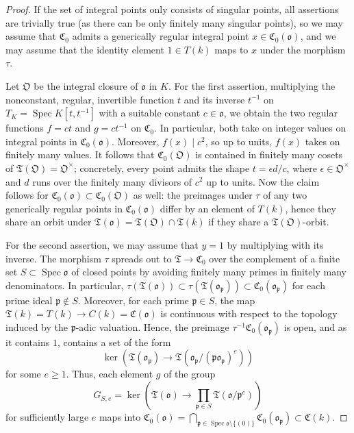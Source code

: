 \documentclass[a4paper, twoside, 11pt]{amsart}
\theoremstyle{definition}
\newcommand{\mC}{\mathfrak{C}}
\newcommand{\mT}{\mathfrak{T}}
\newcommand{\fo}{\mathfrak{o}}
\newcommand{\fO}{\mathfrak{O}}
\newcommand{\fp}{\mathfrak{p}}
\DeclareMathOperator{\Spec}{Spec}
\begin{document}
\begin{proof}
If the set of integral points only consists of singular points, all assertions are trivially true (as there can be only finitely many singular points), so we may assume that $\mC_0$ admits a generically regular integral point $x\in \mC_0(\fo)$, and we may assume that the identity element $1\in T(k)$ maps to $x$ under the morphism $\tau$.

Let $\fO$ be the integral closure of $\fo$ in $K$.
For the first assertion, multiplying the nonconstant, regular, invertible function $t$ and its inverse $t^{-1}$ on $T_K=\Spec K[t,t^{-1}]$ with a suitable constant $c\in \fo$, we obtain the two regular functions $f=ct$ and $g=ct^{-1}$ on $\mC_0$. In particular, both take on integer values on integral points in $\mC_0(\fo)$. Moreover, $f(x)\mid c^2$, so up to units, $f(x)$ takes on finitely many values. It follows that $\mC_0(\fO)$ is contained in finitely many cosets of
$\mT(\fO) =\fO^\times$;
concretely, every point admits the shape $t=\epsilon d/c$, where $\epsilon\in \fO^\times$ and $d$ runs over the finitely many divisors of $c^2$ up to units.
Now the claim follows for $\mC_0(\fo)\subset \mC_0(\fO)$ as well: the preimages under $\tau$ of any two generically regular points in $\mC_0(\fo)$ differ by an element of $T(k)$, hence they share an orbit under $\mT(\fo) = \mT(\fO)\cap \mT(k)$ if they share a $\mT(\fO)$-orbit.


For the second assertion, we may assume that $y=1$ by multiplying with its inverse. The morphism $\tau$ spreads out to $\mT\to \mC_0$ over the complement of a finite set $S\subset \Spec\fo$ of closed points by avoiding finitely many primes in finitely many denominators. In particular, $\tau(\mT(\fo))\subset \tau(\mT(\fo_\fp)) \subset \mC_0(\fo_\fp)$ for each prime ideal $\fp\not\in S$. Moreover, for each prime $\fp\in S$, the map
$\mT(k) = T(k) \to C(k) = \mC(\fo)$ is continuous with respect to the topology induced by the $\fp$-adic valuation. Hence, the preimage $\tau^{-1}\mC_0(\fo_\fp)$ is open, and as it contains $1$, contains a set of the form
\begin{equation*}
	\ker (\mT(\fo_\fp) \to \mT(\fo_\fp/(\fp\fo_\fp)^e))
\end{equation*}
for some $e\ge 1$.
Thus, each element $g$ of the group
\begin{equation*}
	G_{S,e} = \ker\left(\mT(\fo) \to \prod_{\fp\in S} \mT(\fo/\fp^e)\right)
\end{equation*}
for sufficiently large $e$ maps into $\mC_0(\fo) = \bigcap_{\fp\in \Spec\fo \setminus \{(0)\}} \mC_0(\fo_\fp) \subset \mC(k)$.
\end{proof}
\end{document}
